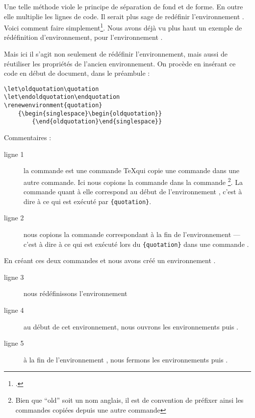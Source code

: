 Une telle méthode viole le principe de séparation de fond et de forme. En outre elle multiplie les lignes de code. Il serait plus sage de redéfinir l'environnement . Voici comment faire simplement\footcite[Nous nous somme basés sur la classe ][]{bredele}. Nous avons déjà vu plus haut un exemple de rédéfinition d'environnement, pour l'environnement . 

Mais ici il s'agit non seulement de rédéfinir l'environnement, mais aussi de réutiliser les propriétés de l'ancien environnement. On procède en insérant ce code en début de document, dans le préambule :

\begin{verbatim}
\let\oldquotation\quotation
\let\endoldquotation\endquotation
\renewenvironment{quotation}
	{\begin{singlespace}\begin{oldquotation}}
        {\end{oldquotation}\end{singlespace}}
\end{verbatim}

Commentaires : 

\begin{description}
\item[ligne 1]la commande  est une commande \TeX qui copie une commande dans une autre commande. Ici nous copions la commande  dans la commande \footnote{Bien que \enquote{old} soit un nom anglais, il est de convention de préfixer ainsi les commandes copiées depuis une autre commande}. La commande  quant à elle correspond au début de l'environnement , c'est à dire à ce qui est exécuté par \verb|{quotation}|.
\item[ligne 2] nous copions la commande  correspondant à la fin de l'environnement   --- c'est à dire à ce qui est exécuté lors du \verb|{quotation}| dans une commande .
\end{description}

En créant ces deux commandes  et  nous avons créé un environnement .

\begin{description}
\item[ligne 3]nous rédéfinissons l'environnement 
\item[ligne 4]au début de cet environnement, nous ouvrons les environnements  puis .
\item[ligne 5]à la fin de l'environnement , nous fermons les environnements  puis .
\end{description}


